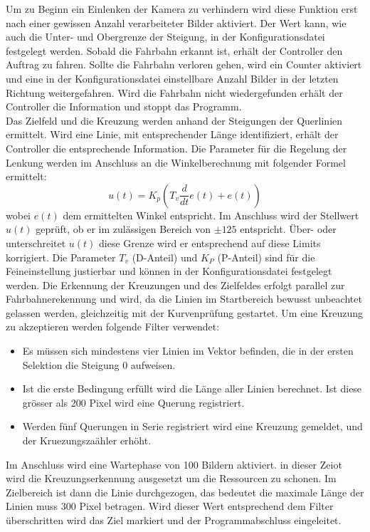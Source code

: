 Um zu Beginn ein Einlenken der Kamera zu verhindern wird diese Funktion erst nach einer gewissen Anzahl verarbeiteter Bilder aktiviert. Der Wert kann, wie auch die Unter- und Obergrenze der Steigung, in der Konfigurationsdatei festgelegt werden. 
Sobald die Fahrbahn erkannt ist, erhält der Controller den Auftrag zu fahren. Sollte die Fahrbahn verloren gehen, wird ein Counter aktiviert und eine in der Konfigurationsdatei einstellbare Anzahl Bilder in der letzten Richtung weitergefahren. Wird die Fahrbahn nicht wiedergefunden erhält der Controller die Information und stoppt das Programm.\\
Das Zielfeld und die Kreuzung werden anhand der Steigungen der Querlinien ermittelt. Wird eine Linie, mit entsprechender Länge identifiziert, erhält der Controller die entsprechende Information.
Die Parameter für die Regelung der Lenkung werden im Anschluss an die Winkelberechnung mit folgender Formel ermittelt:
\[
u(t) = K_p\left(T_v\frac{d}{dt}e(t) + e(t)\right)
\]
wobei $e(t)$ dem ermittelten Winkel entspricht. Im Anschluss wird der Stellwert $u(t)$ geprüft, ob er im zulässigen Bereich von $\pm 125$ entspricht. Über- oder unterschreitet $u(t)$ diese Grenze wird er entsprechend auf diese Limits korrigiert. Die Parameter $T_v$ (D-Anteil) und $K_{P}$ (P-Anteil) sind für die Feineinstellung justierbar und können in der Konfigurationsdatei festgelegt werden.
Die Erkennung der Kreuzungen und des Zielfeldes erfolgt parallel zur Fahrbahnerekennung und wird, da die Linien im Startbereich bewusst unbeachtet gelassen werden, gleichzeitig mit der Kurvenprüfung gestartet. Um eine Kreuzung zu akzeptieren werden folgende Filter verwendet:
\begin{itemize}
\item Es müssen sich mindestens vier Linien im Vektor befinden, die in der ersten Selektion die Steigung 0 aufweisen.
\item Ist die erste Bedingung erfüllt wird die Länge aller Linien berechnet. Ist diese grösser als 200 Pixel wird eine Querung registriert.
\item Werden fünf Querungen in Serie registriert wird eine Kreuzung gemeldet, und der Kruezungszaähler erhöht.
\end{itemize}
Im Anschluss wird eine Wartephase von 100 Bildern aktiviert. in dieser Zeiot wird die Kreuzungserkennung ausgesetzt um die Ressourcen zu schonen. Im Zielbereich ist dann die Linie durchgezogen, das bedeutet die maximale Länge der Linien muss 300 Pixel betragen. Wird dieser Wert entsprechend dem Filter überschritten wird das Ziel markiert und der Programmabschluss eingeleitet.\\[0.2cm]
